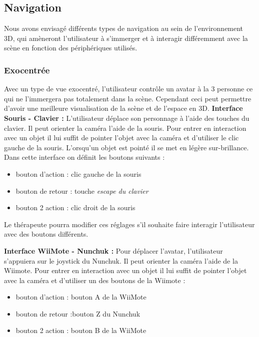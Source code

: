 \subsection{Navigation}
Nous avons envisagé différents types de navigation au sein de l’environnement 3D, qui amèneront l’utilisateur à s’immerger et à interagir différemment avec la scène en fonction des périphériques utilisés.

\subsubsection{Exocentrée}
Avec un type de vue exocentré, l’utilisateur contrôle un avatar à la 3 personne ce qui ne l’immergera pas totalement dans la scène. Cependant ceci peut permettre d'avoir une meilleure visualisation de la scène et de l'espace en 3D.
\newline
\textbf{Interface Souris - Clavier : }
L’utilisateur déplace son personnage à l’aide des touches du clavier. Il peut orienter la caméra l’aide de la souris. Pour entrer en interaction avec un objet il lui suffit de pointer l’objet avec la caméra et d’utiliser le clic gauche de la souris. L'orsqu'un objet est pointé il se met en légère sur-brillance.
Dans cette interface on définit les boutons suivants :
	\begin{itemize}\renewcommand{\labelitemi}{$\bullet$}
  				\item bouton d’action : clic gauche de la souris
				 \item bouton de retour : touche \em{escape} du clavier
  				\item  bouton 2 action : clic droit de la souris
			\end{itemize}
Le thérapeute pourra modifier ces réglages s'il souhaite faire interagir l'utilisateur avec des boutons différents.
\newline


\textbf{Interface WiiMote - Nunchuk : }
Pour déplacer l’avatar, l’utilisateur s'appuiera sur le joystick du Nunchuk. Il peut orienter la caméra l’aide de la Wiimote. Pour entrer en interaction avec un objet il lui suffit de pointer l’objet avec la caméra et d’utiliser un des boutons de la Wiimote :
	\begin{itemize}\renewcommand{\labelitemi}{$\bullet$}
  				\item bouton d’action : bouton A de la WiiMote
				 \item bouton de retour :bouton Z du Nunchuk
  				\item  bouton 2 action : bouton B de la WiiMote
			\end{itemize}

